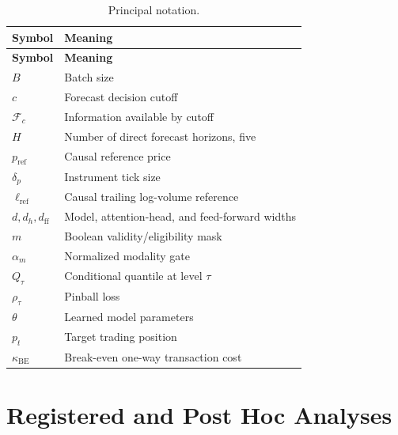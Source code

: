 \documentclass[10pt,letterpaper]{article}
\numberwithin{equation}{section}
\theoremstyle{definition}
\theoremstyle{remark}
\begin{document}
\begin{longtable}{@{}p{2.8cm}p{11.2cm}@{}}
\caption{Principal notation.}\label{tab:notation}\\
\toprule
\textbf{Symbol} & \textbf{Meaning}\\
\midrule
\endfirsthead
\toprule
\textbf{Symbol} & \textbf{Meaning}\\
\midrule
\endhead
\(B\) & Batch size\\
\(c\) & Forecast decision cutoff\\
\(\mathcal{F}_c\) & Information available by cutoff\\
\(H\) & Number of direct forecast horizons, five\\
\(p_{\mathrm{ref}}\) & Causal reference price\\
\(\delta_p\) & Instrument tick size\\
\(\ell_{\mathrm{ref}}\) & Causal trailing log-volume reference\\
\(d,d_h,d_{\mathrm{ff}}\) & Model, attention-head, and feed-forward widths\\
\(m\) & Boolean validity/eligibility mask\\
\(\alpha_m\) & Normalized modality gate\\
\(Q_\tau\) & Conditional quantile at level \(\tau\)\\
\(\rho_\tau\) & Pinball loss\\
\(\theta\) & Learned model parameters\\
\(p_t\) & Target trading position\\
\(\kappa_{\mathrm{BE}}\) & Break-even one-way transaction cost\\
\bottomrule
\end{longtable}

\section{Registered and Post Hoc Analyses}
\end{document}
